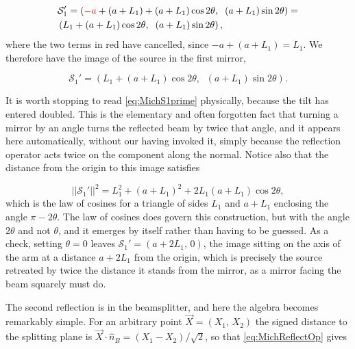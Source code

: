         \begin{align*}
            & \mathcal{S}_1' = \left({\color{red}-a} + \left(a+L_1\right) + \left(a+L_1\right)\cos 2\theta,\;\; \left(a+L_1\right)\sin 2\theta\right) = \\
            & \left(L_1 + \left(a+L_1\right)\cos 2\theta,\;\; \left(a+L_1\right)\sin 2\theta\right),
        \end{align*}
        where the two terms in red have cancelled, since $-a+(a+L_1) = L_1$. We therefore have the image of the source in the first mirror,

        \begin{equation}\label{eq:MichS1prime}
            \mathcal{S}_1' = \left(L_1 + \left(a+L_1\right)\cos 2\theta,\;\; \left(a+L_1\right)\sin 2\theta\right).
        \end{equation}

        It is worth stopping to read \ref{eq:MichS1prime} physically, because the tilt has entered doubled. This is the elementary and often forgotten fact that turning a mirror by an angle turns the reflected beam by twice that angle, and it appears here automatically, without our having invoked it, simply because the reflection operator acts twice on the component along the normal. Notice also that the distance from the origin to this image satisfies

        \begin{equation*}
            \left|\left|\mathcal{S}_1'\right|\right|^{2} = L_1^{2} + \left(a+L_1\right)^{2} + 2L_1\left(a+L_1\right)\cos 2\theta ,
        \end{equation*}
        which is the law of cosines for a triangle of sides $L_1$ and $a+L_1$ enclosing the angle $\pi - 2\theta$. The law of cosines does govern this construction, but with the angle $2\theta$ and not $\theta$, and it emerges by itself rather than having to be guessed. As a check, setting $\theta = 0$ leaves $\mathcal{S}_1' = (a+2L_1,\,0)$, the image sitting on the axis of the arm at a distance $a+2L_1$ from the origin, which is precisely the source retreated by twice the distance it stands from the mirror, as a mirror facing the beam squarely must do.

        The second reflection is in the beamsplitter, and here the algebra becomes remarkably simple. For an arbitrary point $\vec{X} = \left(X_1,\,X_2\right)$ the signed distance to the splitting plane is $\vec{X}\cdot\hat{n}_B = \left(X_1-X_2\right)/\sqrt{2}$, so that \ref{eq:MichReflectOp} gives

